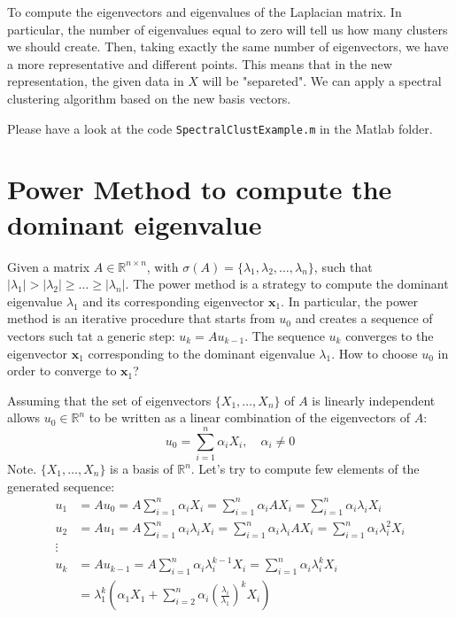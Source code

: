 To compute the eigenvectors and eigenvalues of the Laplacian matrix. In particular,
the number of eigenvalues equal to zero will tell us how many clusters we should create.
Then, taking exactly the same number of eigenvectors, we have a more representative and
different points. This means that in the new representation, the given data in \( X \)
will be "separeted". We can apply a spectral clustering algorithm based on the new basis vectors.

Please have a look at the code \texttt{SpectralClustExample.m} in the Matlab folder.

\section{Power Method to compute the dominant eigenvalue}
Given a matrix $A \in \mathbb{R}^{n \times n}$, with
$\sigma(A) = \{ \lambda_1, \lambda_2, \ldots, \lambda_n \}$, such that
$|\lambda_1| > |\lambda_2| \geq \ldots \geq |\lambda_n|$.
The power method is a strategy to compute the dominant eigenvalue $\lambda_1$ and its corresponding
eigenvector $\mathbf{x}_1$.
In particular, the power method is an iterative procedure that starts from $u_0$ and creates a sequence of
vectors such tat a generic step: $u_{k} = A u_{k-1}$.
The sequence $u_k$ converges to the eigenvector $\mathbf{x}_1$ corresponding to the dominant eigenvalue $\lambda_1$.
How to choose $u_0$ in order to converge to $\mathbf{x}_1$?

Assuming that the set of eigenvectors $\{X_1, \ldots, X_n\}$ of $A$ is linearly independent allows
$u_0 \in \mathbb{R}^n$ to be written as a linear combination of the eigenvectors of $A$:
\[
u_0 = \sum_{i=1}^{n} \alpha_i X_i, \quad \alpha_i \neq 0
\]
Note. $\{X_1, \ldots, X_n\}$ is a basis of $\mathbb{R}^n$.
Let's try to compute few elements of the generated sequence:
$$
\begin{aligned}
  u_1 &= A u_0 = A \sum_{i=1}^{n} \alpha_i X_i = \sum_{i=1}^{n} \alpha_i A X_i = \sum_{i=1}^{n} \alpha_i \lambda_i X_i \\
  u_2 &= A u_1 = A \sum_{i=1}^{n} \alpha_i \lambda_i X_i = \sum_{i=1}^{n} \alpha_i \lambda_i A X_i = \sum_{i=1}^{n} \alpha_i \lambda_i^2 X_i \\
  \vdots \\
  u_k &= A u_{k-1} = A \sum_{i=1}^{n} \alpha_i \lambda_i^{k-1} X_i = \sum_{i=1}^{n} \alpha_i \lambda_i^k X_i \\
  &= \lambda_1^k \left( \alpha_1 X_1 + \sum_{i=2}^{n} \alpha_i \left( \frac{\lambda_i}{\lambda_1} \right)^k X_i \right)
\end{aligned}
$$

